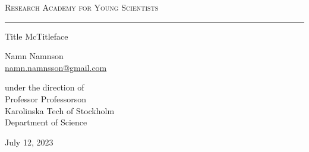 \singlespacing

\def\studentname{Namn Namnson}
\def\studentsurname{Namnsson, N}
\def\studentmail{namn.namnsson@gmail.com}

\def\raysminipaperdate{June 22, 2023}
\def\raysfinalpaperdate{July 12, 2023}


\begin{titlepage}
    \centering
    \LARGE
    \textsc{Research Academy for Young Scientists}

    \vspace{12pt}
    \hrule
    \vspace{6cm}
    
    \LARGE
    Title McTitleface\\
    \vspace{1cm}
    \large

    \large
    \studentname\\
    \url{\studentmail}
    \vspace{0.5cm}

    under the direction of\\
    Professor Professorson\\
    Karolinska Tech of Stockholm \\
    Department of Science
    \vspace{7cm}
    
    
    \raysfinalpaperdate\\
    
\end{titlepage}
\thispagestyle{empty}